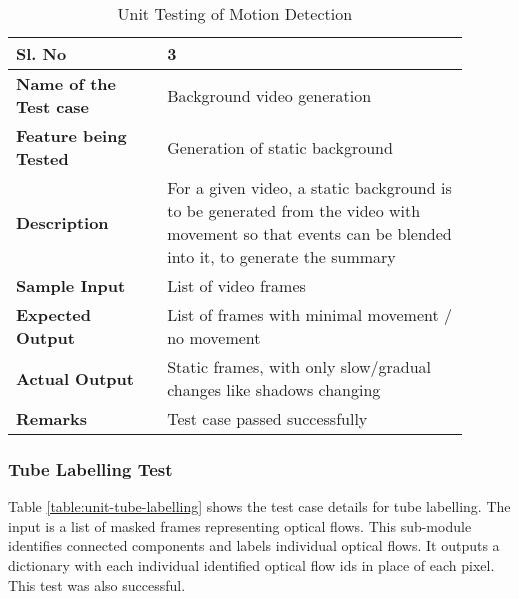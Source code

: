         \FloatBarrier
        \begin{table}[H]
            \caption{Unit Testing of Motion Detection}
            \begin{tabular}{|p{0.3\linewidth}|p{0.6\linewidth}|}
                \hline
                \textbf{Sl. No }              &\textbf{ 3}\\
                \hline
                \textbf{Name of the Test case}& Background video generation \\
                \hline
                \textbf{Feature being Tested}  & Generation of static background \\
                \hline
                \textbf{Description}           & For a given video, a static
                background is to be generated from the video with movement so
                that events can be blended into it, to generate the summary \\
                \hline
                \textbf{Sample Input}          & List of video frames \\
                \hline
                \textbf{Expected Output}       & List of frames with
                minimal movement / no movement \\
                \hline
                \textbf{Actual Output}         & Static frames, with only
                slow/gradual changes like shadows changing \\
                \hline
                \textbf{Remarks }              & Test case passed successfully \\
                \hline
            \end{tabular}
            \label{table:unit-background-generation}
        \end{table}


        \subsubsection{Tube Labelling Test}

        Table \ref{table:unit-tube-labelling} shows the test case details for
        tube labelling. The input is a list of masked frames representing
        optical flows. This sub-module identifies connected components and
        labels individual optical flows. It outputs a dictionary with each
        individual identified optical flow ids in place of each pixel. This
        test was also successful.

